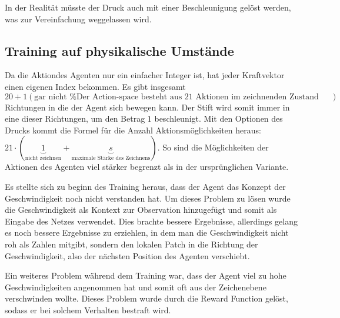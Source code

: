 In der Realität müsste der Druck auch mit einer Beschleunigung gelöst werden,
was zur Vereinfachung weggelassen wird.

\subsection*{Training auf physikalische Umstände}



Da die Aktiondes Agenten nur ein einfacher Integer ist, hat jeder Kraftvektor
einen eigenen Index bekommen. Es gibt insgesamt $20 + 1 (\text{gar nicht     %
bewegen})$ Richtungen in die der Agent sich bewegen kann. Der Stift wird somit %
immer in eine dieser Richtungen, um den Betrag $1$ beschleunigt. Mit den
Optionen des Drucks kommt die Formel für die Anzahl Aktionsmöglichkeiten heraus:
$21\cdot(\underbrace{1}_{\text{nicht zeichnen}} + \underbrace{s}_{\text{maximale
Stärke des Zeichnens}})$. So sind die Möglichkeiten der Aktionen des Agenten
viel stärker begrenzt als in der ursprünglichen Variante. %

Es stellte sich zu beginn des Training heraus, dass der Agent das Konzept der
Geschwindigkeit noch nicht verstanden hat. Um dieses Problem zu lösen wurde die %
Geschwindigkeit als Kontext zur Observation hinzugefügt und somit als Eingabe   %
des Netzes verwendet. Dies brachte bessere Ergebnisse, allerdings gelang es noch
bessere Ergebnisse zu erziehlen, in dem man die Geschwindigkeit nicht roh als
Zahlen mitgibt, sondern den lokalen Patch in die Richtung der Geschwindigkeit,
also der nächsten Position des Agenten verschiebt.

Ein weiteres Problem während dem Training war, dass der Agent viel zu hohe
Geschwindigkeiten angenommen hat und somit oft aus der Zeichenebene verschwinden
wollte. Dieses Problem wurde durch die Reward Function gelöst, sodass er bei
solchem Verhalten bestraft wird.

